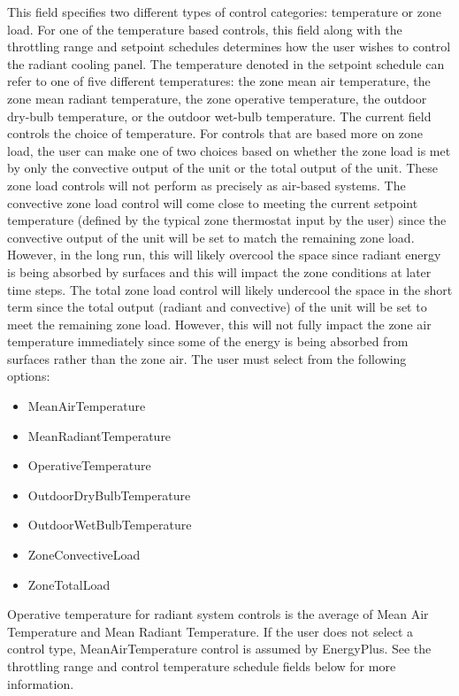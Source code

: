 This field specifies two different types of control categories: temperature or zone load.  For one of the temperature based controls, this field along with the throttling range and setpoint schedules determines how the user wishes to control the radiant cooling panel.  The temperature denoted in the setpoint schedule can refer to one of five different temperatures: the zone mean air temperature, the zone mean radiant temperature, the zone operative temperature, the outdoor dry-bulb temperature, or the outdoor wet-bulb temperature.  The current field controls the choice of temperature.  For controls that are based more on zone load, the user can make one of two choices based on whether the zone load is met by only the convective output of the unit or the total output of the unit.  These zone load controls will not perform as precisely as air-based systems.  The convective zone load control will come close to meeting the current setpoint temperature (defined by the typical zone thermostat input by the user) since the convective output of the unit will be set to match the remaining zone load.  However, in the long run, this will likely overcool the space since radiant energy is being absorbed by surfaces and this will impact the zone conditions at later time steps.  The total zone load control will likely undercool the space in the short term since the total output (radiant and convective) of the unit will be set to meet the remaining zone load.  However, this will not fully impact the zone air temperature immediately since some of the energy is being absorbed from surfaces rather than the zone air.  The user must select from the following options:

\begin{itemize}
\tightlist
\item
  MeanAirTemperature
\item
  MeanRadiantTemperature
\item
  OperativeTemperature
\item
  OutdoorDryBulbTemperature
\item
  OutdoorWetBulbTemperature
\item
  ZoneConvectiveLoad
\item
  ZoneTotalLoad
\end{itemize}

Operative temperature for radiant system controls is the average of Mean Air Temperature and Mean Radiant Temperature. If the user does not select a control type, MeanAirTemperature control is assumed by EnergyPlus. See the throttling range and control temperature schedule fields below for more information.

